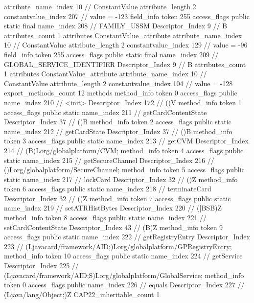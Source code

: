 {{{{{{{					attribute_name_index	10		// ConstantValue
					attribute_length	2
					constantvalue_index	207		// value = -123
				}
				}
			}
			field_info {
				token	255
				access_flags	public static final
				name_index	208		// FAMILY_USSM
				Descriptor_Index	9		// B
				attributes_count	1
				attributes {
				ConstantValue_attribute {
					attribute_name_index	10		// ConstantValue
					attribute_length	2
					constantvalue_index	129		// value = -96
				}
				}
			}
			field_info {
				token	255
				access_flags	public static final
				name_index	209		// GLOBAL_SERVICE_IDENTIFIER
				Descriptor_Index	9		// B
				attributes_count	1
				attributes {
				ConstantValue_attribute {
					attribute_name_index	10		// ConstantValue
					attribute_length	2
					constantvalue_index	104		// value = -128
				}
				}
			}
			}
			export_methods_count	12
			methods {
				method_info {
					token	0
					access_flags	public
					name_index	210		// <init>
					Descriptor_Index	172		// ()V
				}
				method_info {
					token	1
					access_flags	public static
					name_index	211		// getCardContentState
					Descriptor_Index	37		// ()B
				}
				method_info {
					token	2
					access_flags	public static
					name_index	212		// getCardState
					Descriptor_Index	37		// ()B
				}
				method_info {
					token	3
					access_flags	public static
					name_index	213		// getCVM
					Descriptor_Index	214		// (B)Lorg/globalplatform/CVM;
				}
				method_info {
					token	4
					access_flags	public static
					name_index	215		// getSecureChannel
					Descriptor_Index	216		// ()Lorg/globalplatform/SecureChannel;
				}
				method_info {
					token	5
					access_flags	public static
					name_index	217		// lockCard
					Descriptor_Index	32		// ()Z
				}
				method_info {
					token	6
					access_flags	public static
					name_index	218		// terminateCard
					Descriptor_Index	32		// ()Z
				}
				method_info {
					token	7
					access_flags	public static
					name_index	219		// setATRHistBytes
					Descriptor_Index	220		// ([BSB)Z
				}
				method_info {
					token	8
					access_flags	public static
					name_index	221		// setCardContentState
					Descriptor_Index	43		// (B)Z
				}
				method_info {
					token	9
					access_flags	public static
					name_index	222		// getRegistryEntry
					Descriptor_Index	223		// (Ljavacard/framework/AID;)Lorg/globalplatform/GPRegistryEntry;
				}
				method_info {
					token	10
					access_flags	public static
					name_index	224		// getService
					Descriptor_Index	225		// (Ljavacard/framework/AID;S)Lorg/globalplatform/GlobalService;
				}
				method_info {
					token	0
					access_flags	public
					name_index	226		// equals
					Descriptor_Index	227		// (Ljava/lang/Object;)Z
				}
			}
			CAP22_inheritable_count	1
		}
	}
}
